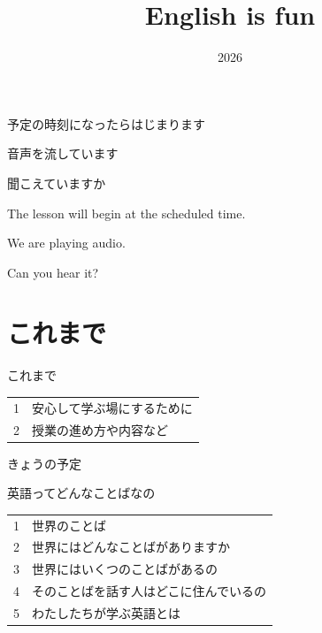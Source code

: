 \documentclass[
  ignorenonframetext,
  aspectratio=169,
  xcolor=dvipsnames]{beamer}
\title{English is fun}
\author{}
\date{\vspace{-2.5em}2026}
\begin{document}
\frame{\titlepage}

\begin{frame}{}
\protect{}\label{section}
\thispagestyle{empty}
\Large

\raggedright

予定の時刻になったらはじまります

\textbullet  音声を流しています

\textbullet  聞こえていますか　

\vfill

\raggedleft

The lesson will begin at the scheduled time.

\vspace{-6pt}

We are playing audio.

\vspace{-6pt}

Can you hear it?
\end{frame}

\begin{frame}{}
\protect{}\label{section-1}
\thispagestyle{empty}
\titlepage
\end{frame}

\begin{frame}{}
\protect{}\label{section-2}
\section{これまで}
\end{frame}

\begin{frame}{これまで}
\protect{}\label{ux3053ux308cux307eux3067}
\thispagestyle{empty}
\LARGE

\begin{tabular}{rl}
1&安心して学ぶ場にするために\\
2&授業の進め方や内容など
\end{tabular}
\end{frame}

\begin{frame}{きょうの予定}
\protect{}\label{ux304dux3087ux3046ux306eux4e88ux5b9a}
\thispagestyle{empty}
\LARGE

英語ってどんなことばなの

\bigskip

\Large
\begin{tabular}{rl}
1&世界のことば\\
2&世界にはどんなことばがありますか\\
3&世界にはいくつのことばがあるの\\
4&そのことばを話す人はどこに住んでいるの\\
5&わたしたちが学ぶ英語とは
\end{tabular}
\end{frame}
\end{document}
